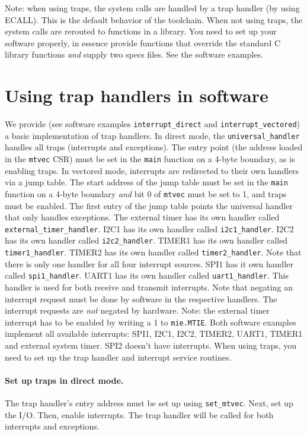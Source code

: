 \documentclass[12pt]{article}
\begin{document}
Note: when using traps, the system calls are handled by a trap handler (by using ECALL). This is the default behavior of the toolchain. When not using traps, the system calls are rerouted to functions in a library. You need to set up your software properly, in essence provide functions that override the standard C library functions \textit{and} supply two specs files. See the software examples.

\section{Using trap handlers in software}
\label{sec:traphandling}
We provide (see software examples \lstinline|interrupt_direct| and \lstinline|interrupt_vectored|) a basic implementation of trap handlers. In direct mode, the \lstinline|universal_handler| handles all traps (interrupts and exceptions). The entry point (the address loaded in the \lstinline|mtvec| CSR) must be set in the \lstinline|main| function on a 4-byte boundary, as is enabling traps. In vectored mode, interrupts are redirected to their own handlers via a jump table. The start address of the jump table must be set in the \lstinline|main| function on a 4-byte boundary \textit{and} bit 0 of \lstinline|mtvec| must be set to 1, and traps must be enabled. The first entry of the jump table points the universal handler that only handles exceptions. The external timer has its own handler called \lstinline|external_timer_handler|. I2C1 has its own handler called \lstinline|i2c1_handler|. I2C2 has its own handler called \lstinline|i2c2_handler|. TIMER1 has its own handler called \lstinline|timer1_handler|. TIMER2 has its own handler called \lstinline|timer2_handler|. Note that there is only one handler for all four interrupt sources. SPI1 has it own handler called \lstinline|spi1_handler|. UART1 has its own handler called \lstinline|uart1_handler|. This handler is used for both receive and transmit interrupts. Note that negating an interrupt request must be done by software in the respective handlers. The interrupt requests are \emph{not} negated by hardware. Note: the external timer interrupt has to be enabled by writing a 1 to \lstinline|mie.MTIE|. Both software examples implement all available interrupts: SPI1, I2C1, I2C2, TIMER2, UART1, TIMER1 and external system timer. SPI2 doesn't have interrupts. When using traps, you need to set up the trap handler and interrupt service routines.

\paragraph*{Set up traps in direct mode.} The trap handler's entry address must be set up using \lstinline|set_mtvec|. Next, set up the I/O. Then, enable interrupts. The trap handler will be called for both interrupts and exceptions.
\end{document}
